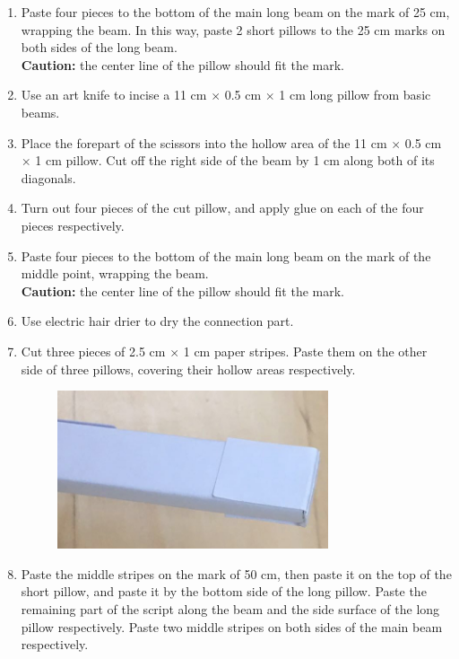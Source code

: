 \begin{enumerate}
\begin{enumerate}
\begin{figure}[H]
	\end{figure}
	\item Paste four pieces to the bottom of the main long beam on the mark of 25 cm, wrapping the beam. In this way, paste 2 short pillows to the 25 cm marks on both sides of the long beam. 
	\\ \textbf{Caution:} the center line of the pillow should fit the mark.
	\item Use an art knife to incise a 11 cm $\times$ 0.5 cm $\times$ 1 cm long pillow from basic beams. 
	\item Place the forepart of the scissors into the hollow area of the 11 cm $\times$ 0.5 cm $\times$ 1 cm pillow. Cut off the right side of the beam by 1 cm along both of its diagonals.
	\item Turn out four pieces of the cut pillow, and apply glue on each of the four pieces respectively. 
	\item Paste four pieces to the bottom of the main long beam on the mark of the middle point, wrapping the beam. 
	\\ \textbf{Caution:} the center line of the pillow should fit the mark.
	\item Use electric hair drier to dry the connection part. 
	\item Cut three pieces of 2.5 cm $\times$ 1 cm paper stripes. Paste them on the other side of three pillows, covering their hollow areas respectively.
	\begin{figure}[H]
	\begin{center}
	\includegraphics[width=8cm]{figure/procedureBridge/p2}
	\end{center}
	\end{figure}
	\item Paste the middle stripes on the mark of 50 cm, then paste it on the top of the short pillow, and paste it by the bottom side of the long pillow. Paste the remaining part of the script along the beam and the side surface of the long pillow respectively. Paste two middle stripes on both sides of the main beam respectively. 
	\begin{figure}[H]

\end{figure}
\end{enumerate}
\end{enumerate}
